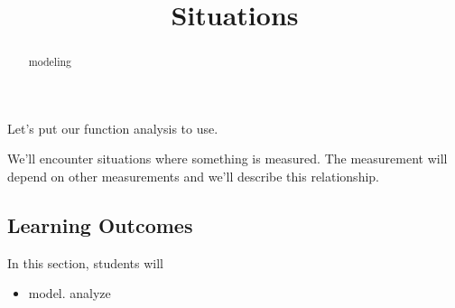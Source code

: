\documentclass{ximera}
\title{Situations}
\begin{document}
\begin{abstract}
modeling
\end{abstract}
\maketitle



Let's put our function analysis to use.

We'll encounter situations where something is measured.  The measurement will depend on other measurements and we'll describe this relationship.









\subsection{Learning Outcomes}


\begin{sectionOutcomes}
In this section, students will 

\begin{itemize}
\item model.
\tem analyze
\end{itemize}
\end{sectionOutcomes}
\end{document}

